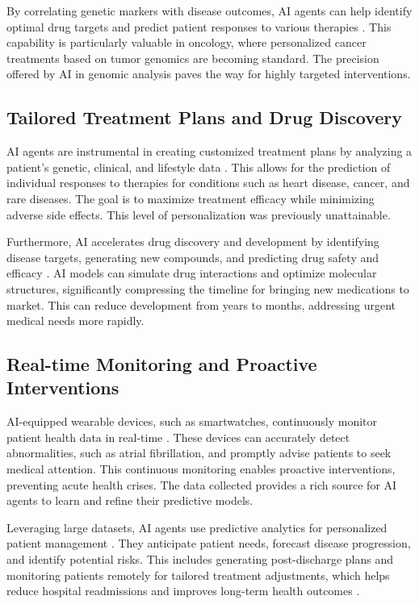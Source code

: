 \documentclass[12pt,a4paper]{article}
\begin{document}
By correlating genetic markers with disease outcomes, AI agents can help identify optimal drug targets and predict patient responses to various therapies \cite{compunnel.com}. This capability is particularly valuable in oncology, where personalized cancer treatments based on tumor genomics are becoming standard. The precision offered by AI in genomic analysis paves the way for highly targeted interventions.

\subsection{Tailored Treatment Plans and Drug Discovery}
AI agents are instrumental in creating customized treatment plans by analyzing a patient's genetic, clinical, and lifestyle data \cite{medicalfuturist.com}. This allows for the prediction of individual responses to therapies for conditions such as heart disease, cancer, and rare diseases. The goal is to maximize treatment efficacy while minimizing adverse side effects. This level of personalization was previously unattainable.

Furthermore, AI accelerates drug discovery and development by identifying disease targets, generating new compounds, and predicting drug safety and efficacy \cite{compunnel.com}. AI models can simulate drug interactions and optimize molecular structures, significantly compressing the timeline for bringing new medications to market. This can reduce development from years to months, addressing urgent medical needs more rapidly.

\subsection{Real-time Monitoring and Proactive Interventions}
AI-equipped wearable devices, such as smartwatches, continuously monitor patient health data in real-time \cite{medium.com}. These devices can accurately detect abnormalities, such as atrial fibrillation, and promptly advise patients to seek medical attention. This continuous monitoring enables proactive interventions, preventing acute health crises. The data collected provides a rich source for AI agents to learn and refine their predictive models.

Leveraging large datasets, AI agents use predictive analytics for personalized patient management \cite{ibm.com}. They anticipate patient needs, forecast disease progression, and identify potential risks. This includes generating post-discharge plans and monitoring patients remotely for tailored treatment adjustments, which helps reduce hospital readmissions and improves long-term health outcomes \cite{emerline.com}.
\end{document}
